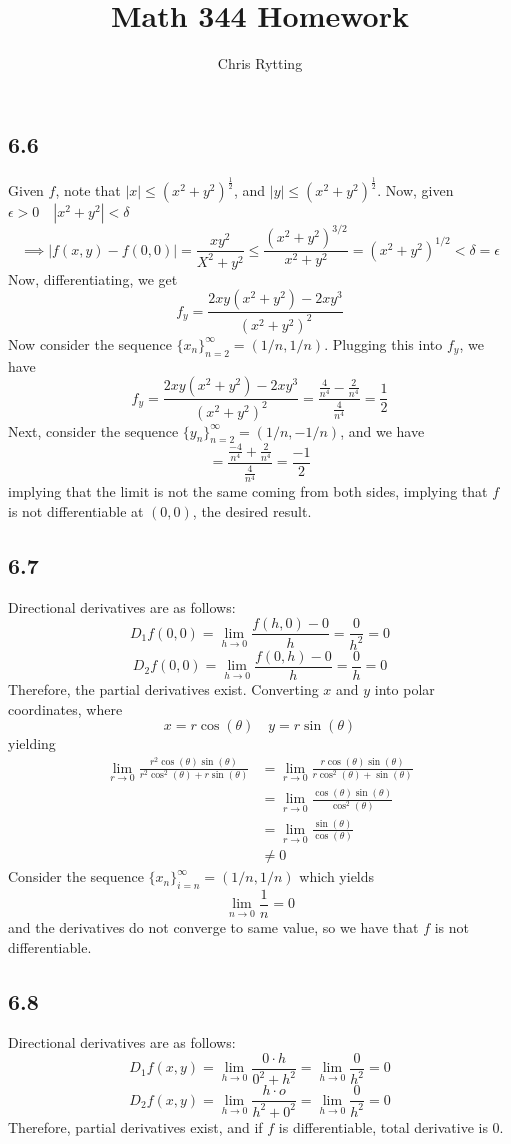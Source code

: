 \documentclass[letterpaper,12pt]{article}
\theoremstyle{definition}
\begin{document}
\title{Math 344 Homework }
\author{Chris Rytting}
\maketitle


\subsection*{6.6}
Given $f$, note that $|x| \leq (x^2 +y^2)^\frac{1}{2}$, and $|y|\leq (x^2 +y^2)^\frac{1}{2}$. Now, given $\epsilon > 0 \quad |x^2+y^2|<\delta$
\[\implies |f(x,y) - f(0,0)| = \frac{xy^2}{X^2+y^2}\leq \frac{(x^2+y^2)^{3/2}}{x^2+y^2} = (x^2+y^2)^{1/2} <\delta = \epsilon\]
Now, differentiating, we get
\[f_y = \frac{2xy(x^2+y^2) - 2xy^3}{(x^2+y^2)^2}\]
Now consider the sequence $\{x_n\}_{n=2}^\infty = (1/n, 1/n)$. Plugging this into $f_y$, we have 
\[f_y = \frac{2xy(x^2+y^2) - 2xy^3}{(x^2+y^2)^2} = \frac{\frac{4}{n^4}- \frac{2}{n^4}}{\frac{4}{n^4}} = \frac{1}{2}\]
Next, consider the sequence $\{y_n\}_{n=2}^\infty = (1/n, -1/n)$, and we have
\[= \frac{\frac{-4}{n^4}+ \frac{2}{n^4}}{\frac{4}{n^4}} = \frac{-1}{2}\]
implying that the limit is not the same coming from both sides, implying that $f$ is not differentiable at $(0,0)$, the desired result.

\subsection*{6.7}
Directional derivatives are as follows:
\[D_1f(0,0) = \lim_{h\to0} \frac{f(h,0) - 0}{h} = \frac{0}{h^2}= 0\]
\[D_2f(0,0) = \lim_{h\to0}\frac{f(0,h) - 0}{h} = \frac{0}{h}= 0\]
Therefore, the partial derivatives exist.
Converting $x$ and $y$ into polar coordinates, where 
\[x = r\cos(\theta) \quad y = r\sin(\theta)\] 
yielding 
\begin{align*}
\lim_{r\to0} \frac{r^2\cos(\theta)\sin(\theta)}{r^2\cos^2(\theta)+r\sin(\theta)}
&=\lim_{r\to0} \frac{r\cos(\theta)\sin(\theta)}{r\cos^2(\theta)+\sin(\theta)}
\\&=\lim_{r\to0} \frac{\cos(\theta)\sin(\theta)}{\cos^2(\theta)}
\\&=\lim_{r\to0}\frac{\sin(\theta)}{\cos(\theta)}\\
&\not = 0
\end{align*}
Consider the sequence $\{x_n\}_{i=n}^\infty = (1/n,1/n)$ which yields
\[\lim_{n \to 0} \frac{1}{n} = 0\]
and the derivatives do not converge to same value, so we have that $f$ is not differentiable.


\subsection*{6.8}
Directional derivatives are as follows:
\[ D_1f(x,y) = \lim_{h\rightarrow 0} \frac{0 \cdot h}{0^2 + h^2} = \lim_{h\rightarrow 0} \frac{0}{h^2} = 0 \]
\[ D_2f(x,y) = \lim_{h\rightarrow 0} \frac{h \cdot o}{h^2 + 0^2} = \lim_{h\rightarrow 0} \frac{0}{h^2} = 0 \]
Therefore, partial derivatives exist, and if $f$ is differentiable, total derivative is $0$.
\end{document}
